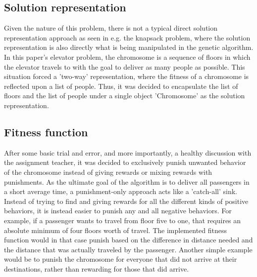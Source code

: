 \subsection{Solution representation}

Given the nature of this problem, there is not a typical direct solution representation approach as seen in e.g. the knapsack problem, where the solution representation is also directly what is being manipulated in the genetic algorithm. In this paper's elevator problem, the chromosome is a sequence of floors in which the elevator travels to with the goal to deliver as many people as possible. This situation forced a 'two-way' representation, where the fitness of a chromosome is reflected upon a list of people. Thus, it was decided to encapsulate the list of floors and the list of people under a single object 'Chromosome' as the solution representation.

\subsection{Fitness function}
\label{subsec:fitness_function}

After some basic trial and error, and more importantly, a healthy discussion with the assignment teacher, it was decided to exclusively punish unwanted behavior of the chromosome instead of giving rewards or mixing rewards with punishments. As the ultimate goal of the algorithm is to deliver all passengers in a short average time, a punishment-only approach acts like a 'catch-all' sink. Instead of trying to find and giving rewards for all the different kinds of positive behaviors, it is instead easier to punish any and all negative behaviors. For example, if a passenger wants to travel from floor five to one, that requires an absolute minimum of four floors worth of travel. The implemented fitness function would in that case punish based on the difference in distance needed and the distance that was actually traveled by the passenger. Another simple example would be to punish the chromosome for everyone that did not arrive at their destinations, rather than rewarding for those that did arrive.
